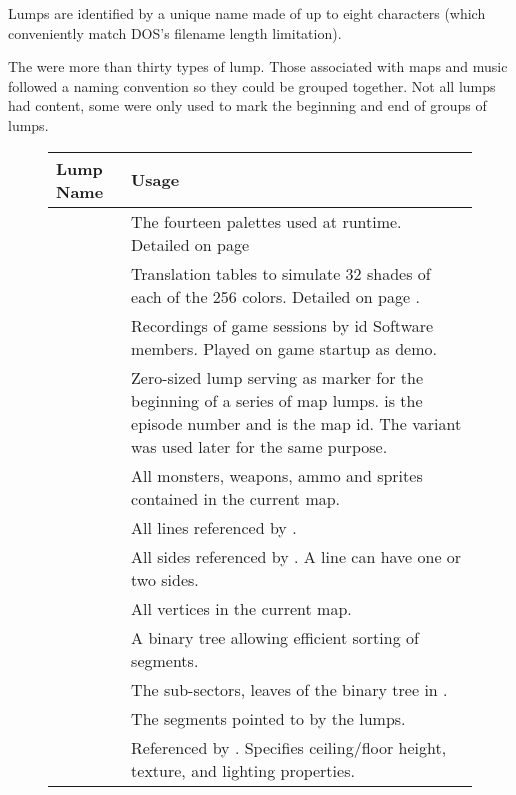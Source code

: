 Lumps are identified by a unique name made of up to eight characters (which conveniently match DOS's filename length limitation).\\
\par
{}
\par
The were more than thirty types of lump. Those associated with maps and music followed a naming convention so they could be grouped together. Not all lumps had content, some were only used to mark the beginning and end of groups of lumps.
\pagebreak

\begin{figure}[H]
\centering  
\begin{tabularx}{\textwidth}{ L{0.2}  L{0.8}}
  \toprule
  \textbf{Lump Name} &  \textbf{Usage} \\
   
  \toprule 
   & The fourteen palettes used at runtime. Detailed on page \pageref{label_palettes} \\
   & Translation tables to simulate 32 shades of each of the 256 colors. Detailed on page \pageref{diminishedlightning}. \\
   &  Recordings of game sessions by id Software members. Played on game startup as demo.\\
  \toprule
   & Zero-sized lump serving as marker for the beginning of a series of map lumps.  is the episode number and  is the map id. The  variant was used later for the same purpose.\\
   & All monsters, weapons, ammo and sprites contained in the current map.\\
   & All lines referenced by .\\
   & All sides referenced by . A line can have one or two sides.\\
   & All vertices in the current map.\\
   & A binary tree allowing efficient sorting of segments. \\
   &  The sub-sectors, leaves of the binary tree in .  \\
   &  The segments pointed to by the  lumps.\\
   &  Referenced by . Specifies ceiling/floor height, texture, and lighting properties.\\
  

\end{tabularx}
\end{figure}
